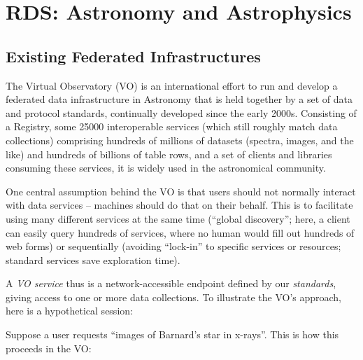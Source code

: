 \section{RDS: Astronomy and Astrophysics}


\subsection{Existing Federated Infrastructures}

The Virtual Observatory (VO) is an international effort to run and
develop a federated data infrastructure in Astronomy that is held
together by a set of data and protocol standards, continually developed
since the early 2000s.  Consisting of a Registry, some 25000
interoperable services (which still roughly match data collections)
comprising hundreds of millions of datasets (spectra, images, and the
like) and hundreds of billions of table rows, and a set of clients and
libraries consuming these services, it is widely used in the
astronomical community.

One central assumption behind the VO is that users should not normally
interact with data services -- machines should do that on their behalf.
This is to facilitate using many different services at the same time
(``global discovery''; here, a client can easily query hundreds of
services, where no human would fill out hundreds of web forms) or
sequentially (avoiding ``lock-in'' to specific services or resources;
standard services save exploration time).

A \emph{VO service} thus is a network-accessible endpoint defined by 
our \emph{standards}, giving access to one or more data collections.  
To illustrate the VO's approach, here is a hypothetical session:

Suppose a user requests ``images of Barnard's
star in x-rays''.  This is how this proceeds in the VO:

